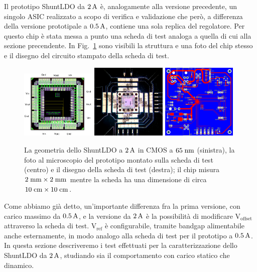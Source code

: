 Il prototipo ShuntLDO da $2\rm \, A$ \`e, analogamente alla versione precedente, un singolo ASIC realizzato a scopo di verifica e validazione che per\`o, a differenza della versione prototipale a $0.5\rm \, A$, contiene una sola replica del regolatore. Per questo chip \`e stata messa a punto una scheda di test analoga a quella di cui alla sezione precendente. In Fig.~\ref{PCB2A} sono visibili la struttura e una foto del chip stesso e il disegno del circuito stampato della scheda di test. 
\begin{figure}
\centering
\includegraphics[width=0.32\textwidth]{Immagini/chipSLDO2A.png}
\hfill
\includegraphics[width=0.32\textwidth]{Immagini/chip2_foto.png}
\hfill
\includegraphics[width=0.32\textwidth]{Immagini/chipcard.png}
\caption{La geometria dello ShuntLDO a $2\rm \, A$ in CMOS a $65\rm \; nm$ (sinistra), la foto al microscopio del prototipo montato sulla scheda di test (centro) e il disegno della scheda di test (destra); il chip misura $2\rm \; mm\times 2\rm \; mm$ mentre la scheda ha una dimensione di circa $10\rm \; cm \times 10\rm \; cm$.}
\label{PCB2A}
\end{figure}
Come abbiamo già detto, un'importante differenza fra la prima versione, con carico massimo da $0.5\rm \, A$, e la versione da $2\rm \, A$ è la possibilità di modificare $\mathrm{V_{offset}}$ attraverso la scheda di test. $\mathrm{V_{ref}}$ \`e configurabile, tramite bandgap alimentabile anche esternamente, in modo analogo alla scheda di test per il prototipo a $0.5\rm \, A$. In questa sezione descriveremo i test effettuati per la caratterizzazione dello ShuntLDO da $2\rm \, A$, studiando sia il comportamento con carico statico che dinamico.

